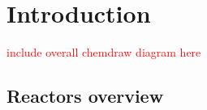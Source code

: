 \section{Introduction}
\textcolor{red}{include overall chemdraw diagram here}
\subsection{Reactors overview}



